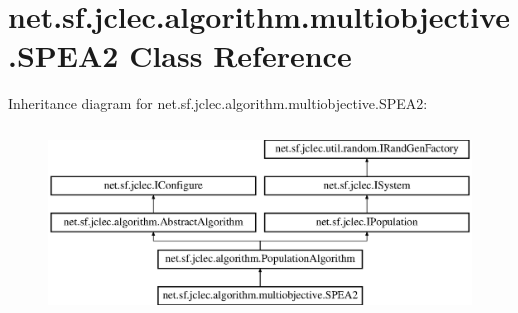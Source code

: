 \hypertarget{classnet_1_1sf_1_1jclec_1_1algorithm_1_1multiobjective_1_1_s_p_e_a2}{\section{net.\-sf.\-jclec.\-algorithm.\-multiobjective.\-S\-P\-E\-A2 Class Reference}
\label{classnet_1_1sf_1_1jclec_1_1algorithm_1_1multiobjective_1_1_s_p_e_a2}
}
Inheritance diagram for net.\-sf.\-jclec.\-algorithm.\-multiobjective.\-S\-P\-E\-A2\-:\begin{figure}[H]
\begin{center}
\leavevmode
\includegraphics[height=5.000000cm]{classnet_1_1sf_1_1jclec_1_1algorithm_1_1multiobjective_1_1_s_p_e_a2}
\end{center}
\end{figure}
